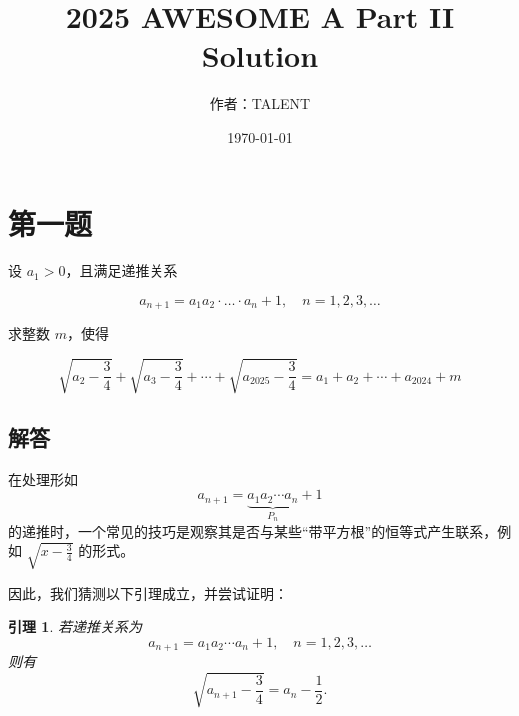 \documentclass[12pt, a4paper]{article}
\newtheorem{lemma}[theorem]{引理}
\theoremstyle{definition}
\theoremstyle{remark}
\begin{document}
\title{\textbf{2025 AWESOME A Part II Solution}}
\author{作者：TALENT}
\date{\today}
\maketitle

\tableofcontents %
\newpage

\section{第一题}

\noindent 设 $a_1>0$，且满足递推关系

$$
a_{n+1}=a_1 a_2 \cdot \ldots \cdot a_n+1, \quad n=1,2,3, \ldots
$$

\noindent 求整数 $m$，使得

$$
\sqrt{a_2-\frac{3}{4}}+\sqrt{a_3-\frac{3}{4}}+\cdots+\sqrt{a_{2025}-\frac{3}{4}}=a_1+a_2+\cdots+a_{2024}+m
$$


\subsection{解答}

\noindent 在处理形如
$$
a_{n+1}=\underbrace{a_1 a_2 \cdots a_n}_{P_n}+1
$$
的递推时，一个常见的技巧是观察其是否与某些“带平方根”的恒等式产生联系，例如 $\sqrt{x-\frac{3}{4}}$ 的形式。

\noindent 因此，我们猜测以下引理成立，并尝试证明：
\begin{lemma}
若递推关系为
$$
a_{n+1}=a_1 a_2 \cdots a_n+1, \quad n=1,2,3,\ldots
$$
则有
$$
\sqrt{a_{n+1}-\frac{3}{4}} = a_n-\frac{1}{2}.
$$
\end{lemma}
\end{document}
